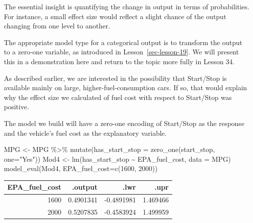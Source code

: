 \documentclass[
  letterpaper,
  DIV=11,
  numbers=noendperiod,
  oneside]{scrreprt}
\newenvironment{Shaded}{\begin{snugshade}}{\end{snugshade}}
\newcommand{\AttributeTok}[1]{\textcolor[rgb]{0.40,0.45,0.13}{#1}}
\newcommand{\DecValTok}[1]{\textcolor[rgb]{0.68,0.00,0.00}{#1}}
\newcommand{\FunctionTok}[1]{\textcolor[rgb]{0.28,0.35,0.67}{#1}}
\newcommand{\NormalTok}[1]{\textcolor[rgb]{0.00,0.23,0.31}{#1}}
\newcommand{\OtherTok}[1]{\textcolor[rgb]{0.00,0.23,0.31}{#1}}
\newcommand{\SpecialCharTok}[1]{\textcolor[rgb]{0.37,0.37,0.37}{#1}}
\newcommand{\StringTok}[1]{\textcolor[rgb]{0.13,0.47,0.30}{#1}}
\begin{document}
The essential insight is quantifying the change in output in terms of
probabilities. For instance, a small effect size would reflect a slight
chance of the output changing from one level to another.

The appropriate model type for a categorical output is to transform the
output to a zero-one variable, as introduced in
Lesson~\ref{sec-lesson-19}. We will present this in a demonstration here
and return to the topic more fully in Lesson 34.

\begin{tcolorbox}[enhanced jigsaw, colbacktitle=quarto-callout-warning-color!10!white, breakable, opacitybacktitle=0.6, colback=white, left=2mm, arc=.35mm, colframe=quarto-callout-warning-color-frame, coltitle=black, toprule=.15mm, opacityback=0, leftrule=.75mm, bottomtitle=1mm, toptitle=1mm, titlerule=0mm, title=\textcolor{quarto-callout-warning-color}{\faExclamationTriangle}\hspace{0.5em}{Demonstration: Start/Stop and vehicle size}, rightrule=.15mm, bottomrule=.15mm]

As described earlier, we are interested in the possibility that
Start/Stop is available mainly on large, higher-fuel-consumption cars.
If so, that would explain why the effect size we calculated of fuel cost
with respect to Start/Stop was positive.

The model we build will have a zero-one encoding of Start/Stop as the
response and the vehicle's fuel cost as the explanatory variable.

\begin{Shaded}
\begin{Highlighting}[]
\NormalTok{MPG }\OtherTok{\textless{}{-}}\NormalTok{ MPG }\SpecialCharTok{\%\textgreater{}\%} 
    \FunctionTok{mutate}\NormalTok{(}\AttributeTok{has\_start\_stop =} \FunctionTok{zero\_one}\NormalTok{(start\_stop, }\AttributeTok{one=}\StringTok{"Yes"}\NormalTok{))}
\NormalTok{Mod4 }\OtherTok{\textless{}{-}} \FunctionTok{lm}\NormalTok{(has\_start\_stop }\SpecialCharTok{\textasciitilde{}}\NormalTok{ EPA\_fuel\_cost, }\AttributeTok{data =}\NormalTok{ MPG)}
\FunctionTok{model\_eval}\NormalTok{(Mod4, }\AttributeTok{EPA\_fuel\_cost=}\FunctionTok{c}\NormalTok{(}\DecValTok{1600}\NormalTok{, }\DecValTok{2000}\NormalTok{))}
\end{Highlighting}
\end{Shaded}

\ttfamily 
\begin{tabular}{rrrr}
\toprule
EPA\_fuel\_cost & .output & .lwr & .upr\\
\midrule
1600 & 0.4901341 & -0.4891981 & 1.469466\\
2000 & 0.5207835 & -0.4583924 & 1.499959\\
\bottomrule
\end{tabular} \normalfont
\bigskip


\end{tcolorbox}
\end{document}
